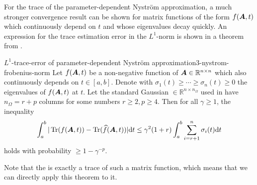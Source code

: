 For the trace of the parameter-dependent Nystr\"om approximation,
a much stronger convergence result can be shown for matrix functions of the form $f(\boldsymbol{A}, t)$
which continuously depend on $t$ and whose eigenvalues decay quickly.
An expression for the trace estimation error in
the $L^1$-norm is shown in a theorem from \cite{he2023parameter}.
\begin{theorem}{$L^1$-trace-error of parameter-dependent Nystr\"om approximation}{3-nystrom-frobenius-norm}
    Let $f(\boldsymbol{A}, t)$ be a non-negative function of $\boldsymbol{A} \in \mathbb{R}^{n \times n}$ which
    also continuously depends on $t \in [a,b]$. 
    Denote with $\sigma_1(t) \geq \cdots \geq \sigma_n(t) \geq 0$ the eigenvalues of $f(\boldsymbol{A}, t)$ at $t$. Let the
    standard Gaussian  $\in \mathbb{R}^{n \times n_{\Omega}}$
    used in  have
    $n_{\Omega} = r + p$ columns for some numbers $r \geq 2, p \geq 4$. Then
    for all $\gamma \geq 1$, the inequality
    \begin{equation}
        \int_{a}^{b} | \operatorname{Tr}(f(\boldsymbol{A}, t)) - \operatorname{Tr}(\widehat{f}(\boldsymbol{A}, t))| \mathrm{d}t
            \leq \gamma^2 (1 + r) \int_{a}^{b} \sum_{i = r+1}^n \sigma_i(t) \mathrm{d}t
    \end{equation}
    holds with probability $\geq 1 - \gamma^{-p}$.
\end{theorem}
Note that the  
is exactly a trace of such a matrix function, which means that we can directly
apply this theorem to it.

